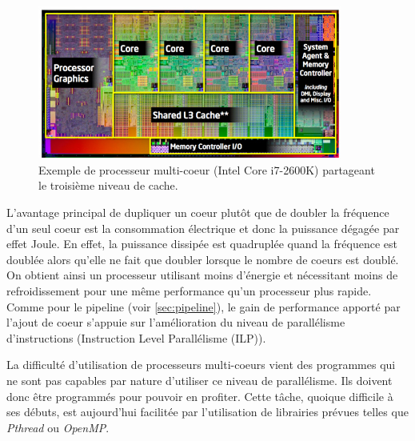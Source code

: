             \begin{figure}
                \center
                \includegraphics[width=10cm]{images/cpu_multicore.jpg}
                \caption{\label{processeur_archi} Exemple de processeur multi-coeur (Intel Core i7-2600K)  partageant le troisième niveau de cache\protect\footnotemark.}
            \end{figure}
            
            
            
            
            L'avantage principal de dupliquer un coeur plutôt que de doubler la fréquence d'un seul coeur est la consommation électrique et donc la puissance dégagée par effet Joule. En effet, la puissance dissipée est quadruplée quand la fréquence est doublée alors qu'elle ne fait que doubler lorsque le nombre de coeurs est doublé. On obtient ainsi un processeur utilisant moins d'énergie et nécessitant moins de refroidissement pour une même performance qu'un processeur plus rapide.
            Comme pour le pipeline (voir \autoref{sec:pipeline}), le gain de performance apporté par l'ajout de coeur s'appuie sur l'amélioration du niveau de parallélisme d'instructions (Instruction Level Parallélisme (ILP)).
            
            
            La difficulté d'utilisation de processeurs multi-coeurs vient des programmes qui ne sont pas capables par nature d'utiliser ce niveau de parallélisme. Ils doivent donc être programmés pour pouvoir en profiter. Cette tâche, quoique difficile à ses débuts, est aujourd'hui facilitée par l'utilisation de librairies prévues telles que \textit{Pthread} ou \textit{OpenMP}. 
            
